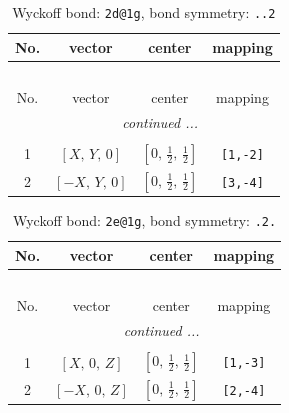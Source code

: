 \documentclass[fleqn,8pt]{jsarticle}
\begin{document}
\renewcommand{\arraystretch}{1.2}
\begin{longtable}{cccc}
\caption{Wyckoff bond: {\tt 2d@1g}, bond symmetry: {\tt ..2}}
 \\
 \hline \hline
No. & vector & center & mapping \\ \hline \endfirsthead

\multicolumn{3}{l}{\tablename\ \thetable{}} \\
 \hline \hline
No. & vector & center & mapping \\ \hline \endhead

 \hline \hline
\multicolumn{3}{r}{\footnotesize\it continued ...} \\ \endfoot

 \hline \hline
\multicolumn{3}{r}{} \\ \endlastfoot

1 & $\left[ X,\, Y,\, 0 \right]$ & $\left[ 0,\, \frac{1}{2},\, \frac{1}{2} \right]$ & {\tt [1,-2]} \\ \hline
2 & $\left[ - X,\, Y,\, 0 \right]$ & $\left[ 0,\, \frac{1}{2},\, \frac{1}{2} \right]$ & {\tt [3,-4]} \\
\end{longtable}
\renewcommand{\arraystretch}{1.2}
\begin{longtable}{cccc}
\caption{Wyckoff bond: {\tt 2e@1g}, bond symmetry: {\tt .2.}}
 \\
 \hline \hline
No. & vector & center & mapping \\ \hline \endfirsthead

\multicolumn{3}{l}{\tablename\ \thetable{}} \\
 \hline \hline
No. & vector & center & mapping \\ \hline \endhead

 \hline \hline
\multicolumn{3}{r}{\footnotesize\it continued ...} \\ \endfoot

 \hline \hline
\multicolumn{3}{r}{} \\ \endlastfoot

1 & $\left[ X,\, 0,\, Z \right]$ & $\left[ 0,\, \frac{1}{2},\, \frac{1}{2} \right]$ & {\tt [1,-3]} \\ \hline
2 & $\left[ - X,\, 0,\, Z \right]$ & $\left[ 0,\, \frac{1}{2},\, \frac{1}{2} \right]$ & {\tt [2,-4]} \\
\end{longtable}
\renewcommand{\arraystretch}{1.2}
\end{document}

